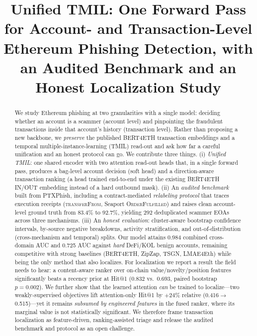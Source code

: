 \documentclass[conference]{IEEEtran}
\begin{document}
\title{Unified TMIL: One Forward Pass for Account- and Transaction-Level
Ethereum Phishing Detection, with an Audited Benchmark and an
Honest Localization Study}
\author{}
\maketitle

\begin{abstract}
We study Ethereum phishing at two granularities with a single model: deciding
whether an account is a scammer (account level) and pinpointing the fraudulent
transactions inside that account's history (transaction level). Rather than
proposing a new backbone, we \emph{preserve} the published BERT4ETH transaction
embeddings and a temporal multiple-instance-learning (TMIL) read-out and ask
how far a careful unification and an honest protocol can go. We contribute three
things. (i) \emph{Unified TMIL}: one shared encoder with two attention read-out
heads that, in a single forward pass, produces a bag-level account decision (soft
head) and a direction-aware transaction ranking (a head trained end-to-end under
the existing BERT4ETH IN/OUT embedding instead of a hard outbound mask). (ii) An
\emph{audited benchmark} built from PTXPhish, including a contract-mediated
\emph{relabeling protocol} that traces execution receipts (\textsc{transferFrom},
Seaport \textsc{OrderFulfilled}) and raises clean account-level ground truth from
83.4\% to 92.7\%, yielding 292 deduplicated scammer EOAs across three mechanisms.
(iii) An \emph{honest evaluation}: cluster-aware bootstrap confidence intervals,
by-source negative breakdowns, activity stratification, and out-of-distribution
(cross-mechanism and temporal) splits. Our model attains 0.984 combined
cross-domain AUC and 0.725 AUC against \emph{hard} DeFi/KOL benign accounts,
remaining competitive with strong baselines (BERT4ETH, ZipZap, TSGN, LMAE4Eth)
while being the only method that also localizes. For localization we report a
result the field needs to hear: a content-aware ranker over on-chain
value/novelty/position features significantly beats a recency prior at Hit@1
(0.832 vs.\ 0.693, paired bootstrap $p{=}0.002$). We further show that the learned
attention \emph{can} be trained to localize---two weakly-supervised objectives lift
attention-only Hit@1 by $+24\%$ relative (0.416$\rightarrow$0.515)---yet it remains
\emph{subsumed by engineered features} in the fused ranker, where its marginal value
is not statistically significant. We therefore frame transaction localization as
feature-driven, ranking-assisted triage and release the audited benchmark and
protocol as an open challenge.
\end{abstract}
\end{document}
